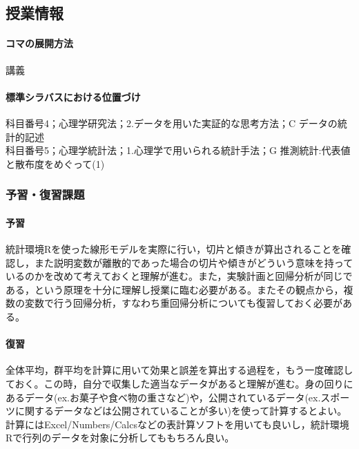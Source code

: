 \subsection{授業情報}
\paragraph{コマの展開方法}
講義
\paragraph{標準シラバスにおける位置づけ}
科目番号4；心理学研究法；2.データを用いた実証的な思考方法；C データの統計的記述\\
科目番号5；心理学統計法；1.心理学で用いられる統計手法；G 推測統計:代表値と散布度をめぐって(1)
\subsubsection{予習・復習課題}
\paragraph{予習}
統計環境Rを使った線形モデルを実際に行い，切片と傾きが算出されることを確認し，また説明変数が離散的であった場合の切片や傾きがどういう意味を持っているのかを改めて考えておくと理解が進む。また，実験計画と回帰分析が同じである，という原理を十分に理解し授業に臨む必要がある。またその観点から，複数の変数で行う回帰分析，すなわち重回帰分析についても復習しておく必要がある。
\paragraph{復習}
全体平均，群平均を計算に用いて効果と誤差を算出する過程を，もう一度確認しておく。この時，自分で収集した適当なデータがあると理解が進む。身の回りにあるデータ(ex.お菓子や食べ物の重さなど)や，公開されているデータ(ex.スポーツに関するデータなどは公開されていることが多い)を使って計算するとよい。計算にはExcel/Numbers/Calcsなどの表計算ソフトを用いても良いし，統計環境Rで行列のデータを対象に分析してももちろん良い。


